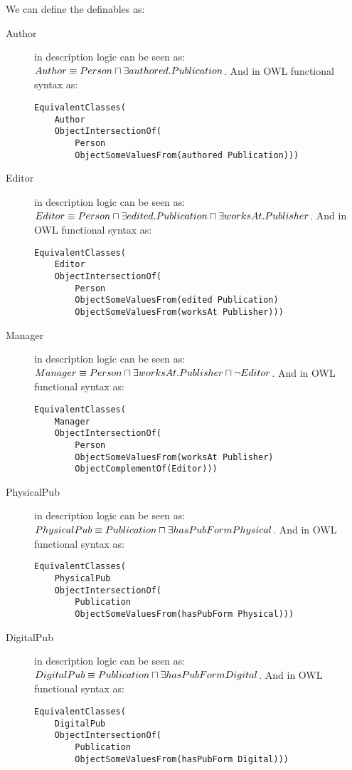 \documentclass[a4paper,12pt]{article}
\begin{document}
We can define the definables as:
\begin{description}
\item[Author] in description logic can be seen as: $ Author \equiv Person\\
\sqcap \exists authored.Publication $.  And in OWL functional syntax as:
\begin{Verbatim}[samepage=true]
EquivalentClasses(
    Author
    ObjectIntersectionOf(
        Person
        ObjectSomeValuesFrom(authored Publication)))
\end{Verbatim}

\item[Editor] in description logic can be seen as: $ Editor \equiv Person\\
\sqcap \exists edited.Publication \sqcap \exists worksAt.Publisher $.  And in
OWL functional syntax as:
\begin{Verbatim}[samepage=true]
EquivalentClasses(
    Editor
    ObjectIntersectionOf(
        Person
        ObjectSomeValuesFrom(edited Publication)
        ObjectSomeValuesFrom(worksAt Publisher)))
\end{Verbatim}

\item[Manager] in description logic can be seen as: $ Manager \equiv Person\\
\sqcap \exists worksAt.Publisher \sqcap \neg Editor $.  And in OWL functional
syntax as:
\begin{Verbatim}[samepage=true]
EquivalentClasses(
    Manager
    ObjectIntersectionOf(
        Person
        ObjectSomeValuesFrom(worksAt Publisher)
        ObjectComplementOf(Editor)))
\end{Verbatim}

\item[PhysicalPub] in description logic can be seen as: $ PhysicalPub \equiv\\
Publication \sqcap \exists hasPubForm Physical $.  And in OWL functional syntax
as:
\begin{Verbatim}[samepage=true]
EquivalentClasses(
    PhysicalPub
    ObjectIntersectionOf(
        Publication
        ObjectSomeValuesFrom(hasPubForm Physical)))
\end{Verbatim}

\item[DigitalPub] in description logic can be seen as: $ DigitalPub \equiv\\
Publication \sqcap \exists hasPubForm Digital $.  And in OWL functional syntax
as:
\begin{Verbatim}[samepage=true]
EquivalentClasses(
    DigitalPub
    ObjectIntersectionOf(
        Publication
        ObjectSomeValuesFrom(hasPubForm Digital)))
\end{Verbatim}
\end{description}
\end{document}

